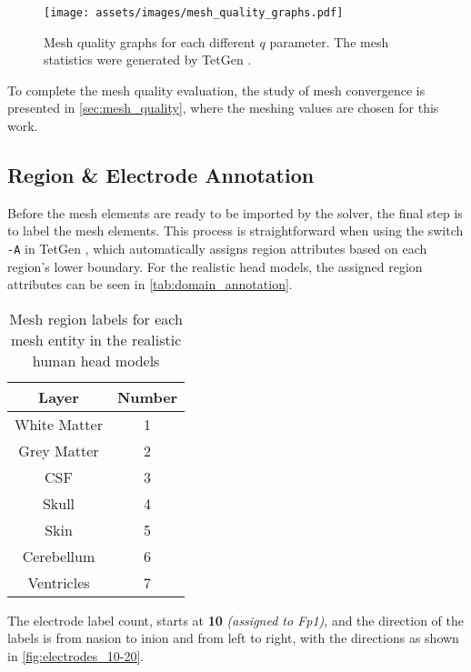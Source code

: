 \begin{figure}[H]
    \centering
    \texttt{[image: assets/images/mesh\_quality\_graphs.pdf]}
    \caption[Mesh quality graphs for each different $q$ parameter]{Mesh quality graphs for each different $q$ parameter. The mesh statistics were generated by TetGen \cite{tetgen}.}
    \label{fig:mesh_quality_graphs}
\end{figure}

To complete the mesh quality evaluation, the study of mesh convergence is presented in \autoref{sec:mesh_quality}, where the meshing values are chosen for this work.

\subsection{Region \& Electrode Annotation}
\label{subsec:elec_annotation}

Before the mesh elements are ready to be imported by the solver, the final step is to label the mesh elements. This process is straightforward when using the switch \texttt{-A} in TetGen \cite{tetgen}, which automatically assigns region attributes based on each region's lower boundary. For the realistic head models, the assigned region attributes can be seen in \autoref{tab:domain_annotation}.

\begin{table}[!ht]
	\centering
	\caption{Mesh region labels for each mesh entity in the realistic human head models}
	\label{tab:domain_annotation}
	\begin{tabular}{|c|c|}
		\hline
		\rowcolor[HTML]{C0C0C0} 
		{\color[HTML]{000000} \textbf{Layer}} & {\color[HTML]{000000} \textbf{Number}} \\ \hline
		White Matter & 1 \\ \hline
		Grey Matter & 2 \\ \hline
		\gls{CSF} & 3 \\ \hline
		Skull & 4 \\ \hline
		Skin & 5 \\ \hline
		Cerebellum & 6 \\ \hline
		Ventricles & 7 \\ \hline
	\end{tabular}
\end{table}

The electrode label count, starts at \textbf{10} \textit{(assigned to Fp1)}, and the direction of the labels is from \gls{nasion} to \gls{inion} and from left to right, with the directions as shown in \autoref{fig:electrodes_10-20}.

